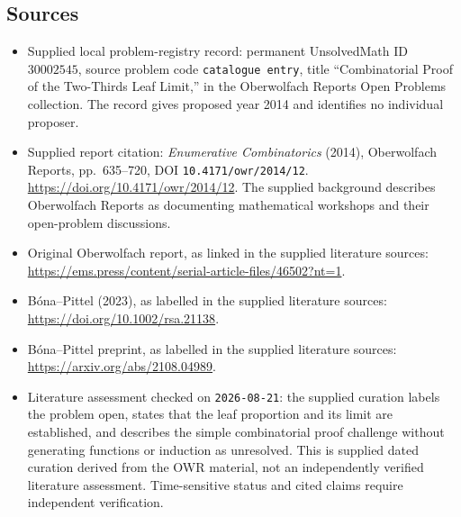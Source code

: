 \documentclass[11pt]{article}
\begin{document}
\subsection{Sources}
\begin{itemize}
\item Supplied local problem-registry record: permanent UnsolvedMath ID \(30002545\), source problem code \texttt{catalogue entry}, title ``Combinatorial Proof of the Two-Thirds Leaf Limit,'' in the Oberwolfach Reports Open Problems collection. The record gives proposed year 2014 and identifies no individual proposer.
\item Supplied report citation: \emph{Enumerative Combinatorics} (2014), Oberwolfach Reports, pp.~635--720, DOI \texttt{10.4171/owr/2014/12}. \url{https://doi.org/10.4171/owr/2014/12}. The supplied background describes Oberwolfach Reports as documenting mathematical workshops and their open-problem discussions.
\item Original Oberwolfach report, as linked in the supplied literature sources: \url{https://ems.press/content/serial-article-files/46502?nt=1}.
\item B\'ona--Pittel (2023), as labelled in the supplied literature sources: \url{https://doi.org/10.1002/rsa.21138}.
\item B\'ona--Pittel preprint, as labelled in the supplied literature sources: \url{https://arxiv.org/abs/2108.04989}.
\item Literature assessment checked on \texttt{2026-08-21}: the supplied curation labels the problem open, states that the leaf proportion and its limit are established, and describes the simple combinatorial proof challenge without generating functions or induction as unresolved. This is supplied dated curation derived from the OWR material, not an independently verified literature assessment. Time-sensitive status and cited claims require independent verification.
\end{itemize}
\end{document}
